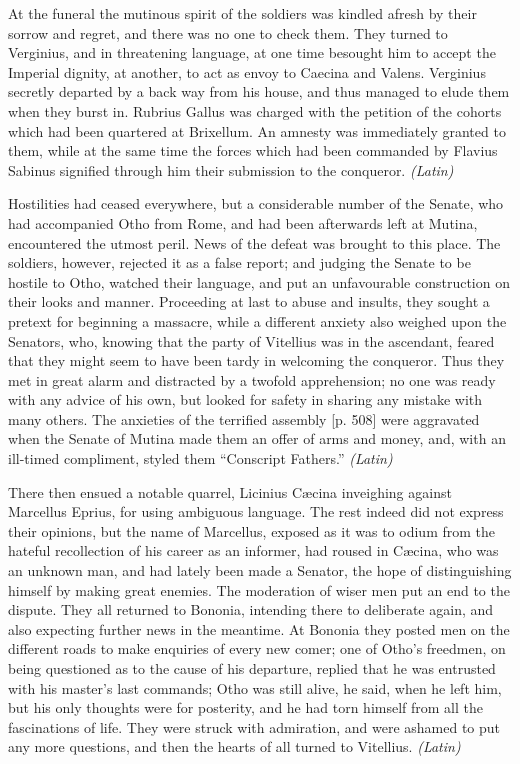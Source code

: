 
At the funeral the mutinous spirit of the soldiers was kindled afresh by their sorrow and regret, and there was no one to check them. They turned to Verginius, and in threatening language, at one time besought him to accept the Imperial dignity, at another, to act as envoy to Caecina and Valens. Verginius secretly departed by a back way from his house, and thus managed to elude them when they burst in. Rubrius Gallus was charged with the petition of the cohorts which had been quartered at Brixellum. An amnesty was immediately granted to them, while at the same time the forces which had been commanded by Flavius Sabinus signified through him their submission to the conqueror. \emph{(Latin)}


Hostilities had ceased everywhere, but a considerable number of the Senate, who had accompanied Otho from Rome, and had been afterwards left at Mutina, encountered the utmost peril. News of the defeat was brought to this place. The soldiers, however, rejected it as a false report; and judging the Senate to be hostile to Otho, watched their language, and put an unfavourable construction on their looks and manner. Proceeding at last to abuse and insults, they sought a pretext for beginning a massacre, while a different anxiety also weighed upon the Senators, who, knowing that the party of Vitellius was in the ascendant, feared that they might seem to have been tardy in welcoming the conqueror. Thus they met in great alarm and distracted by a twofold apprehension; no one was ready with any advice of his own, but looked for safety in sharing any mistake with many others. The anxieties of the terrified assembly [p. 508] were aggravated when the Senate of Mutina made them an offer of arms and money, and, with an ill-timed compliment, styled them ``Conscript Fathers.'' \emph{(Latin)}


There then ensued a notable quarrel, Licinius Cæcina inveighing against Marcellus Eprius, for using ambiguous language. The rest indeed did not express their opinions, but the name of Marcellus, exposed as it was to odium from the hateful recollection of his career as an informer, had roused in Cæcina, who was an unknown man, and had lately been made a Senator, the hope of distinguishing himself by making great enemies. The moderation of wiser men put an end to the dispute. They all returned to Bononia, intending there to deliberate again, and also expecting further news in the meantime. At Bononia they posted men on the different roads to make enquiries of every new comer; one of Otho's freedmen, on being questioned as to the cause of his departure, replied that he was entrusted with his master's last commands; Otho was still alive, he said, when he left him, but his only thoughts were for posterity, and he had torn himself from all the fascinations of life. They were struck with admiration, and were ashamed to put any more questions, and then the hearts of all turned to Vitellius. \emph{(Latin)}

